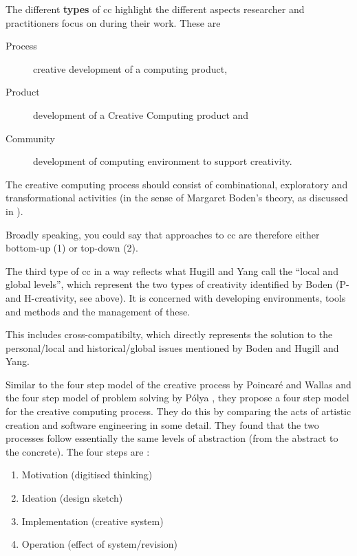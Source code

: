 The different \textbf{types} of \gls{cc} highlight the different aspects researcher and practitioners focus on during their work. These are

\begin{description}
  \item [Process]  creative development of a computing product,
  \item [Product] development of a Creative Computing product and
  \item [Community] development of computing environment to support creativity.
\end{description}

The creative computing process should consist of combinational, exploratory and transformational activities (in the sense of Margaret Boden’s theory, as discussed in ).

\begin{draft}
  Broadly speaking, you could say that approaches to \gls{cc} are therefore either bottom-up (1) or top-down (2).
\end{draft}

The third type of \gls{cc} in a way reflects what Hugill and Yang call the ``local and global levels'', which represent the two types of creativity identified by Boden (P- and H-creativity, see above). It is concerned with developing environments, tools and methods and the management of these.

\begin{draft}
  This includes cross-compatibilty, which directly represents the solution to the personal/local and historical/global issues mentioned by Boden and Hugill and Yang.
\end{draft}

Similar to the four step model of the creative process by Poincaré and Wallas \citep{Poincare2001, Wallas1926} and the four step model of problem solving by Pólya \citep{Polya1957}, they propose a four step model for the creative computing process. They do this by comparing the acts of artistic creation and software engineering in some detail. They found that the two processes follow essentially the same levels of abstraction (from the abstract to the concrete). The four steps are \citep[p.15]{Hugill2013c}:

\begin{enumerate}
  \item Motivation (digitised thinking)
  \item Ideation (design sketch)
  \item Implementation (creative system)
  \item Operation (effect of system/revision)
\end{enumerate}

